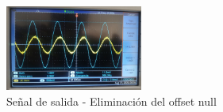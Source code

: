 \begin{figure}[h]
	\centering
	\includegraphics[width=0.4\textwidth]{media/salida-offset-null}
	\caption{Señal de salida - Eliminación del offset null}
	\label{fig:salida-offset-null}
\end{figure}


